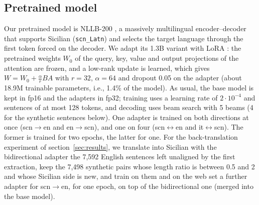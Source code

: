 \documentclass[11pt,a4paper]{article}
\begin{document}
\subsection{Pretrained model}
Our pretrained model is NLLB-200 \citep{nllb2022}, a massively multilingual encoder--decoder that
supports Sicilian (\texttt{scn\_Latn}) and selects the target language through the first token
forced on the decoder. We adapt its 1.3B variant with LoRA \citep{hu2021lora}: the pretrained
weights $W_0$ of the query, key, value and output projections of the attention are frozen, and a
low-rank update is learned, which gives $W=W_0+\frac{\alpha}{r}BA$ with $r{=}32$, $\alpha{=}64$
and dropout 0.05 on the adapter (about 18.9M trainable parameters, i.e., 1.4\% of the model).
As usual, the base model is kept in fp16 and the adapters in fp32; training uses a learning rate of
$2\cdot 10^{-4}$ and sentences of at most 128 tokens, and decoding uses beam search with 5 beams (4 for the synthetic sentences below).
One adapter is trained on both directions at once (scn$\to$en and en$\to$scn),
and one on four (scn$\leftrightarrow$en and it$\leftrightarrow$scn).
The former is trained for two epochs, the latter for one.
For the back-translation experiment of section~\ref{sec:results},
we translate into Sicilian with the bidirectional adapter the 7{,}592 English sentences
left unaligned by the first extraction, keep the 7{,}498 synthetic pairs whose length ratio is
between 0.5 and 2 and whose Sicilian side is new, and train on them
and on the web set a further adapter for scn$\to$en, for one epoch, on top of the bidirectional one (merged into the base model).
\end{document}
